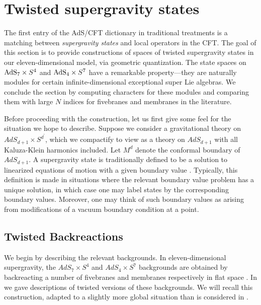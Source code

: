 %
%
%

\section{Twisted supergravity states}
\label{sec:states}

The first entry of the AdS/CFT dictionary in traditional treatments is a matching between \textit{supergravity states} and local operators in the CFT. 
The goal of this section is to provide constructions of spaces of twisted supergravity states in our eleven-dimensional model, via geometric quantization. The state spaces on ${\rm AdS}_{7}\times S^{4}$ and ${\rm AdS}_{4}\times S^{7}$ have a remarkable property---they are naturally modules for certain infinite-dimensional exceptional super Lie algebras. We conclude the section by computing characters for these modules and comparing them with large $N$ indices for fivebranes and membranes in the literature.

Before proceeding with the construction, let us first give some feel for the situation we hope to describe. Suppose we consider a gravitational theory on $AdS_{d+1}\times S^{d^{\prime}}$, which we compactify to view as a theory on $AdS_{d+1}$ with all Kaluza-Klein harmonics included. Let $M^{d}$ denote the conformal boundary of $AdS_{d+1}$. A supergravity state is traditionally defined to be a solution to linearized equations of motion with a given boundary value \cite{}. Typically, this definition is made in situations where the relevant boundary value problem has a unique solution, in which case one may label states by the corresponding boundary values. Moreover, one may think of such boundary values as arising from modifications of a vacuum boundary condition at a point.


\subsection{Twisted Backreactions}
We begin by describing the relevant backgrounds. In eleven-dimensional supergravity, the $AdS_7 \times S^4$ and $AdS_{4}\times S^{7}$ backgrounds are obtained by backreacting a number of fivebranes and membranes respectively in flat space \cite{Maldacena:1997re,WittenAdS}.
In \cite{RSW} we gave descriptions of twisted versions of these backgrounds. We will recall this construction, adapted to a slightly more global situation than is considered in \cite{RSW}.

